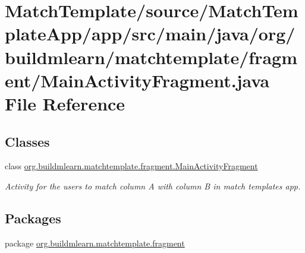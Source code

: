 \hypertarget{MatchTemplate_2source_2MatchTemplateApp_2app_2src_2main_2java_2org_2buildmlearn_2matchtemplate_28ba3955079e039e8d5f320826056b22b}{}\section{Match\+Template/source/\+Match\+Template\+App/app/src/main/java/org/buildmlearn/matchtemplate/fragment/\+Main\+Activity\+Fragment.java File Reference}
\label{MatchTemplate_2source_2MatchTemplateApp_2app_2src_2main_2java_2org_2buildmlearn_2matchtemplate_28ba3955079e039e8d5f320826056b22b}
\subsection*{Classes}
\begin{DoxyCompactItemize}
\item 
class \hyperlink{classorg_1_1buildmlearn_1_1matchtemplate_1_1fragment_1_1MainActivityFragment}{org.\+buildmlearn.\+matchtemplate.\+fragment.\+Main\+Activity\+Fragment}
\begin{DoxyCompactList}\small\item\em Activity for the users to match column A with column B in match template\textquotesingle{}s app. \end{DoxyCompactList}\end{DoxyCompactItemize}
\subsection*{Packages}
\begin{DoxyCompactItemize}
\item 
package \hyperlink{namespaceorg_1_1buildmlearn_1_1matchtemplate_1_1fragment}{org.\+buildmlearn.\+matchtemplate.\+fragment}
\end{DoxyCompactItemize}
